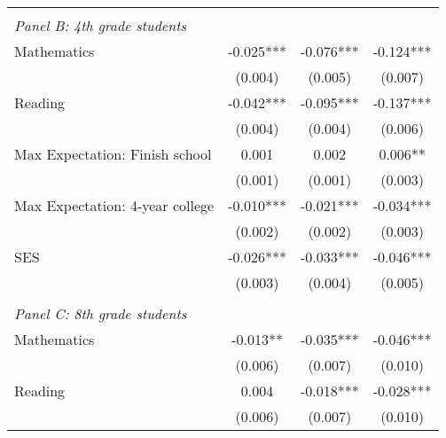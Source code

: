 {\begin{tabular}{lccc}
&  &  &   \\
\multicolumn{4}{l}{\textit{Panel B: 4th grade students}} \\
\hspace{3mm}Mathematics&      -0.025***&      -0.076***&      -0.124***\\
                    &     (0.004)   &     (0.005)   &     (0.007)   \\
 
\hspace{3mm}Reading &      -0.042***&      -0.095***&      -0.137***\\
                    &     (0.004)   &     (0.004)   &     (0.006)   \\
 
\hspace{3mm}Max Expectation: Finish school&       0.001   &       0.002   &       0.006** \\
                    &     (0.001)   &     (0.001)   &     (0.003)   \\
 
\hspace{3mm}Max Expectation: 4-year college&      -0.010***&      -0.021***&      -0.034***\\
                    &     (0.002)   &     (0.002)   &     (0.003)   \\
 
\hspace{3mm}SES     &      -0.026***&      -0.033***&      -0.046***\\
                    &     (0.003)   &     (0.004)   &     (0.005)   \\
 
&  &  &   \\
\multicolumn{4}{l}{\textit{Panel C: 8th grade students}} \\
\hspace{3mm}Mathematics&      -0.013** &      -0.035***&      -0.046***\\
                    &     (0.006)   &     (0.007)   &     (0.010)   \\
 
\hspace{3mm}Reading &       0.004   &      -0.018***&      -0.028***\\
                    &     (0.006)   &     (0.007)   &     (0.010)   \\
 

\end{tabular}}
